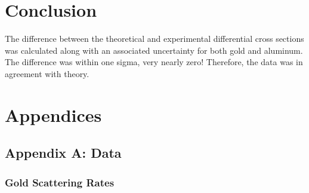 \documentclass[a4paper]{article}
\begin{document}
\section{Conclusion}

\qq The difference between the theoretical and experimental differential cross
sections was calculated along with an associated uncertainty for both gold and
aluminum. The difference was within one sigma, very nearly zero! Therefore, the
data was in agreement with theory.
\qq

\qq

\section{Appendices}

\subsection{Appendix A: Data}

\subsubsection{Gold Scattering Rates}
\end{document}
